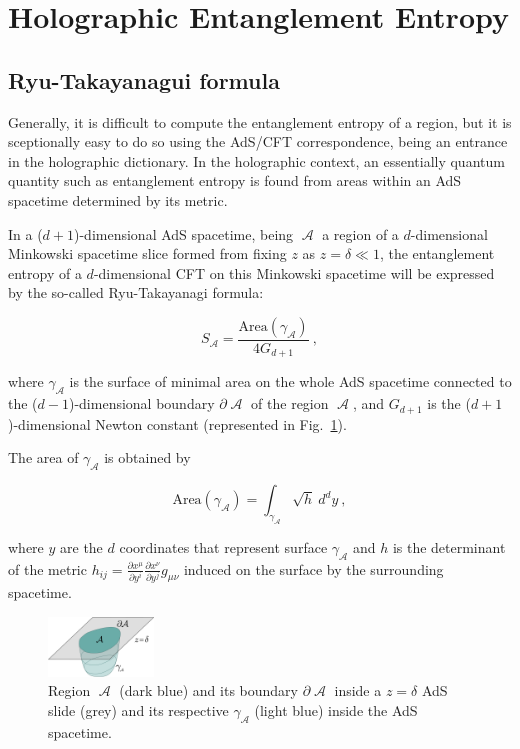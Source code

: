 \documentclass[twocolumn]{revtex4}
\providecommand{\eq}[2]{
    \begin{equation}
        #2
    \label{eq:#1}
    \end{equation}
}
\DeclareMathOperator{\calA}{\mathcal{A}}
\begin{document}
\section{Holographic Entanglement Entropy} \label{s:EE_Holo}


\subsection{Ryu-Takayanagui formula} \label{ss:R-T}

Generally, it is difficult to compute the entanglement entropy of a region, but it is sceptionally easy to do so using the AdS/CFT correspondence, being an entrance in the holographic dictionary. In the holographic context, an essentially quantum quantity such as entanglement entropy is found from areas within an AdS spacetime determined by its metric.

In a ($d+1$)-dimensional AdS spacetime, being $\calA$ a region of a $d$-dimensional Minkowski spacetime slice formed from fixing $z$ as $z=\delta \ll 1$, the entanglement entropy of a $d$-dimensional CFT on this Minkowski spacetime will be expressed by the so-called Ryu-Takayanagi formula:
\eq{EE_RT}{
    S_{\calA} = \frac{ \text{Area}(\gamma_{\calA}) }{ 4 G_{d+1} } \ ,
}
\cite{ryu_holographic_2008} where $\gamma_{\calA}$ is the surface of minimal area on the whole AdS spacetime connected to the ($d-1$)-dimensional boundary $\partial \calA$ of the region $\calA$, and $G_{d+1}$ is the ($d+1$)-dimensional Newton constant (represented in Fig.~\ref{fig:EE_AdS-CFT}).

The area of $\gamma_{\calA}$ is obtained by
\eq{EE_RT-area}{
    \text{Area}(\gamma_{\calA}) = \int_{\gamma_{\calA}} \sqrt{h} \ d^{d}y \ ,
}
where $y$ are the $d$ coordinates that represent surface $\gamma_{\calA}$ and $h$ is the determinant of the metric $h_{ij} = \frac{\partial x^\mu}{\partial y^i} \frac{\partial x^\nu}{\partial y^j} g_{\mu\nu}$ induced on the surface by the surrounding spacetime.

\begin{figure}
    \centering
    \includegraphics[width=0.25\textwidth]{../Imatges/EE_AdS-CFT.png}
\caption{Region $\calA$ (dark blue) and its boundary $\partial \calA$ inside a $z=\delta$ AdS slide (grey) and its respective $\gamma_{\calA}$ (light blue) inside the AdS spacetime.}
\label{fig:EE_AdS-CFT}
\end{figure}
\end{document}
